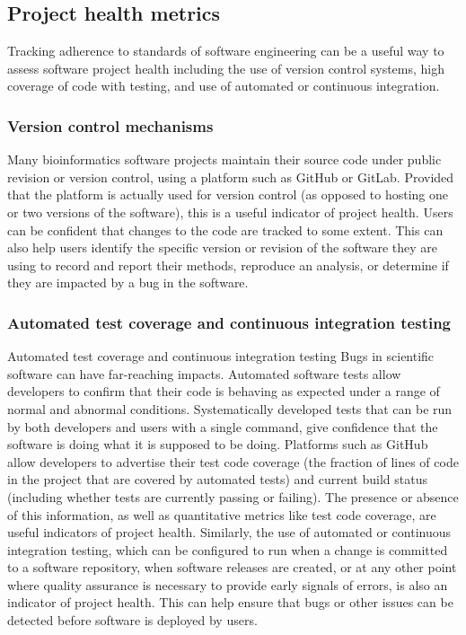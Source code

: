 \documentclass{article}
\begin{document}
\subsection{Project health metrics}
Tracking adherence to standards of software engineering can be a useful way to assess software project health including the use of version control systems, high coverage of code with testing, and use of automated or continuous integration.

\subsubsection{Version control mechanisms}
Many bioinformatics software projects maintain their source code under public revision or version control, using a platform such as GitHub or GitLab. Provided that the platform is actually used for version control (as opposed to hosting one or two versions of the software), this is a useful indicator of project health. Users can be confident that changes to the code are tracked to some extent. This can also help users identify the specific version or revision of the software they are using to record and report their methods, reproduce an analysis, or determine if they are impacted by a bug in the software. 

\subsubsection{Automated test coverage and continuous integration testing}
Automated test coverage and continuous integration testing
Bugs in scientific software can have far-reaching impacts. Automated software tests allow developers to confirm that their code is behaving as expected under a range of normal and abnormal conditions. Systematically developed tests that can be run by both developers and users with a single command, give confidence that the software is doing what it is supposed to be doing. Platforms such as GitHub allow developers to advertise their test code coverage (the fraction of lines of code in the project that are covered by automated tests) and current build status (including whether tests are currently passing or failing). The presence or absence of this information, as well as quantitative metrics like test code coverage, are useful indicators of project health. Similarly, the use of automated or continuous integration testing, which can be configured to run when a change is committed to a software repository, when software releases are created, or at any other point where quality assurance is necessary to provide early signals of errors, is also an indicator of project health. This can help ensure that bugs or other issues can be detected before software is deployed by users.
\end{document}
